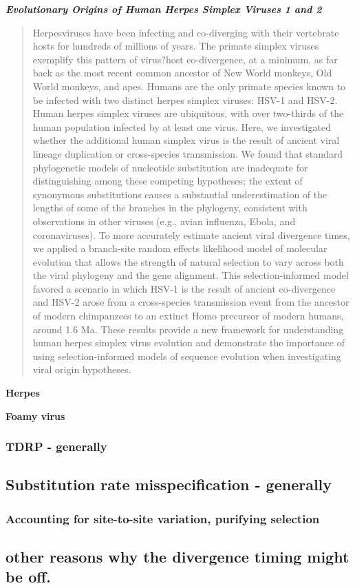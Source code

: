 \textbf{\textit{Evolutionary Origins of Human Herpes Simplex Viruses 1 and 2}}\citep{wertheim2014evolutionary}
\begin{quote}
Herpesviruses have been infecting and co-diverging with their vertebrate hosts for hundreds of millions of years. The
primate simplex viruses exemplify this pattern of virus?host co-divergence, at a minimum, as far back as the most recent
common ancestor of New World monkeys, Old World monkeys, and apes. Humans are the only primate species known to
be infected with two distinct herpes simplex viruses: HSV-1 and HSV-2. Human herpes simplex viruses are ubiquitous,
with over two-thirds of the human population infected by at least one virus. Here, we investigated whether the additional
human simplex virus is the result of ancient viral lineage duplication or cross-species transmission. We found that
standard phylogenetic models of nucleotide substitution are inadequate for distinguishing among these competing
hypotheses; the extent of synonymous substitutions causes a substantial underestimation of the lengths of some of
the branches in the phylogeny, consistent with observations in other viruses (e.g., avian influenza, Ebola, and coronaviruses).
To more accurately estimate ancient viral divergence times, we applied a branch-site random effects likelihood
model of molecular evolution that allows the strength of natural selection to vary across both the viral phylogeny and the
gene alignment. This selection-informed model favored a scenario in which HSV-1 is the result of ancient co-divergence
and HSV-2 arose from a cross-species transmission event from the ancestor of modern chimpanzees to an extinct Homo
precursor of modern humans, around 1.6 Ma. These results provide a new framework for understanding human herpes
simplex virus evolution and demonstrate the importance of using selection-informed models of sequence evolution when
investigating viral origin hypotheses.
\end{quote}

\textbf{Herpes}

\textbf{Foamy virus}

\subsubsection*{TDRP - generally}

\subsection*{Substitution rate misspecification - generally}

\subsubsection*{Accounting for site-to-site variation, purifying selection}

\citep{halpern1998evolutionary}
\citep{brown1982mitochondrial}

\subsection*{other reasons why the divergence timing might be off.}
